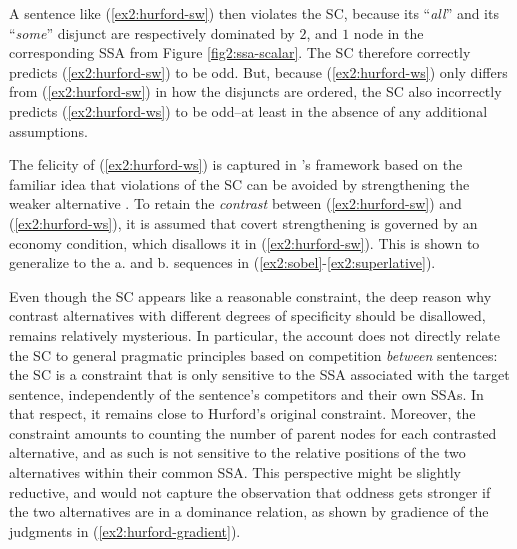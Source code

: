 A sentence like (\ref{ex2:hurford-sw}) then violates the SC, because its ``\textit{all}'' and its ``\textit{some}'' disjunct are respectively dominated by $2$, and $1$ node in the corresponding SSA from Figure \ref{fig2:ssa-scalar}. The SC therefore correctly predicts (\ref{ex2:hurford-sw}) to be odd. But, because (\ref{ex2:hurford-ws}) only differs from (\ref{ex2:hurford-sw}) in how the disjuncts are ordered, the SC also incorrectly predicts (\ref{ex2:hurford-ws}) to be odd--at least in the absence of any additional assumptions.

The felicity of (\ref{ex2:hurford-ws}) is captured in \citet{Ippolito2019}'s framework based on the familiar idea that violations of the SC can be avoided by strengthening the weaker alternative \citep{Gazdar1979,Singh2008a,Singh2008b,Chierchia2009,Fox2018}. To retain the \textit{contrast} between  (\ref{ex2:hurford-sw}) and  (\ref{ex2:hurford-ws}), it is assumed that covert strengthening is governed by an economy condition, which disallows it in (\ref{ex2:hurford-sw}). This is shown to generalize to the a. and b. sequences in (\ref{ex2:sobel}-\ref{ex2:superlative}).


Even though the SC appears like a reasonable constraint, the deep reason why contrast alternatives with different degrees of specificity should be disallowed, remains relatively mysterious. In particular, the account does not directly relate the SC to general pragmatic principles based on competition \textit{between} sentences: the SC is a constraint that is only sensitive to the SSA associated with the target sentence, independently of the sentence's competitors and their own SSAs. In that respect, it remains close to Hurford's original constraint. Moreover, the constraint amounts to counting the number of parent nodes for each contrasted alternative, and as such is not sensitive to the relative positions of the two alternatives within their common SSA. This perspective might be slightly reductive, and would not capture the observation that oddness gets stronger if the two alternatives are in a dominance relation, as shown by gradience of the judgments in (\ref{ex2:hurford-gradient}).

\begin{exe}
	\ex\label{ex2:hurford-gradient}
	\begin{xlist}
	\end{xlist}
\end{exe}


